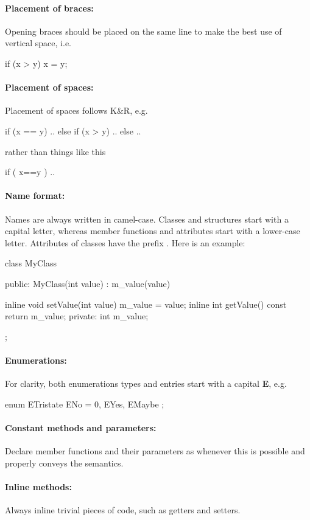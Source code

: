 \paragraph{Placement of braces:} Opening braces should be placed on the 
same line to make the best use of vertical space, i.e.
\begin{cpp}
if (x > y) {
	x = y;
}
\end{cpp}

\paragraph{Placement of spaces:} Placement of spaces follows K\&R, e.g.
\begin{cpp}
if (x == y) {
	..
} else if (x > y) {
	..
} else {
	..
}
\end{cpp}
rather than things like this
\begin{cpp}
if ( x==y ){
}
..
\end{cpp}

\paragraph{Name format:} Names are always written in camel-case. 
Classes and structures start with a capital letter, whereas member functions
and attributes start with a lower-case letter. Attributes of classes 
have the prefix . Here is an example:
\begin{cpp}
class MyClass {
public:
	MyClass(int value) : m_value(value) { }

	inline void setValue(int value) { m_value = value; }
	inline int getValue() const { return m_value; }
private:
	int m_value;
};
\end{cpp}

\paragraph{Enumerations:} For clarity, both enumerations types and entries
start with a capital \textbf{E}, e.g.
\begin{cpp}
enum ETristate {
	ENo = 0,
	EYes,
	EMaybe
};
\end{cpp}
\paragraph{Constant methods and parameters:} Declare member functions and
their parameters as  whenever this is possible
and properly conveys the semantics.
\paragraph{Inline methods:} Always inline trivial pieces of code, such
as getters and setters.
